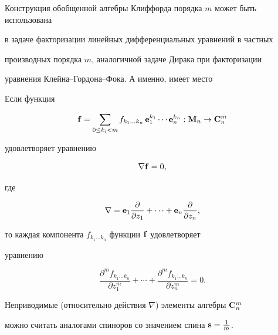 Конструкция обобщенной алгебры Клиффорда порядка $m$ может быть использована


в задаче факторизации линейных дифференциальных уравнений в частных


производных порядка $m$, аналогичной задаче Дирака при факторизации


уравнения Клейна--Гордона--Фока. А именно, имеет место





\begin{thm}


Если функция


$$


{\bold f}= \sum_{0\le k_i<m} f_{k_1\dotsc k_n}\,{\bold e}_1^{k_1}


\dotsb {\bold e}_n^{k_n} :{\bold M}_n\to{\bold C}_n^m


$$


удовлетворяет уравнению


$$


\nabla {\bold f}=0,


$$


где


$$


\nabla = {\bold e}_1\frac{\partial}{\partial z_1}+\dotsb +


{\bold e}_n \frac{\partial}{\partial z_n},


$$


то каждая компонента $f_{k_1\dotsc k_n} $ функции ${\bold f}$ удовлетворяет


уравнению


$$


\frac{\partial^m f_{k_1\dotsc k_n}}{\partial z_1^m}+\dotsb +


\frac{\partial^m f_{k_1\dotsc k_n}}{\partial z_n^m}= 0.


$$


\end{thm}





Неприводимые (относительно действия $\nabla$) элементы алгебры ${\bold C}_n^m$


можно считать аналогами спиноров со значением спина ${\bold s}=\frac{1}{m}$.





